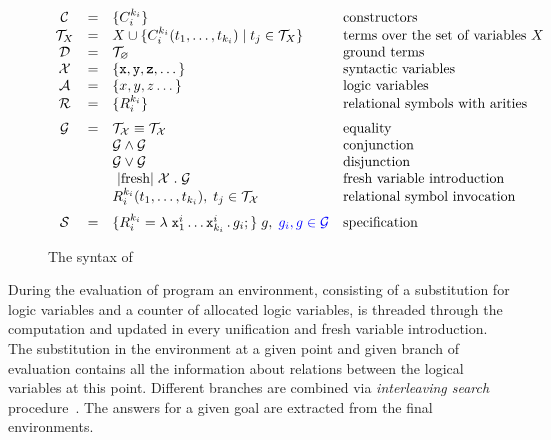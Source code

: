 \begin{figure}[t]
\centering
\[
\begin{array}{ccll}
  \mathcal{C} & = & \{C_i^{k_i}\} & \mbox{constructors} \\
  \mathcal{T}_X & = & X \cup \{C_i^{k_i} (t_1, \dots, t_{k_i}) \mid t_j\in\mathcal{T}_X\} & \mbox{terms over the set of variables $X$} \\
  \mathcal{D} & = & \mathcal{T}_\emptyset & \mbox{ground terms}\\
  \mathcal{X} & = & \{ \ttt{x}, \ttt{y}, \ttt{z}, \dots \} & \mbox{syntactic variables} \\
  \mathcal{A} & = & \{ x, y, z \dots \} & \mbox{logic variables} \\
  \mathcal{R} & = & \{ R_i^{k_i}\} &\mbox{relational symbols with arities} \\[2mm]
  \mathcal{G} & = & \mathcal{T_X}\equiv\mathcal{T_X}   &  \mbox{equality} \\
              &   & \mathcal{G}\wedge\mathcal{G}     & \mbox{conjunction} \\
              &   & \mathcal{G}\vee\mathcal{G}       &\mbox{disjunction} \\
              &   & \mbox{\lstinline|fresh|}\;\mathcal{X}\;.\;\mathcal{G} & \mbox{fresh variable introduction} \\
              &   & R_i^{k_i} (t_1,\dots,t_{k_i}),\;t_j\in\mathcal{T_X} & \mbox{relational symbol invocation} \\[2mm]
  \mathcal{S} & = & \{R_i^{k_i} = \lambda\;\ttt{x}_1^i\dots \ttt{x}_{k_i}^i\,.\, g_i;\}\; g, \; \textcolor{blue}{g_i, g\in\mathcal{G}} & \mbox{specification}
\end{array}
\]
\caption{The syntax of \mK}
\label{fig:syntax}
\end{figure}

During the evaluation of \mK program an environment, consisting of a substitution for logic variables and a counter of allocated logic
variables, is threaded through the computation and updated in every unification and fresh variable introduction.
The substitution in the environment at a given point and given branch of evaluation contains all the information about relations between
the logical variables at this point.
Different branches are combined via \emph{interleaving search} procedure~\cite{Transformers}.
The answers for a given goal are extracted from the final environments.

